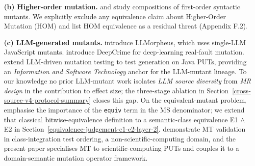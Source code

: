 \documentclass[manuscript,screen,review]{acmart}
\begin{document}
\textbf{(b) Higher-order mutation.} \citet{c03829bdd1a6e45113092384bf0fa05a064ca54a} and \citet{kintis2018effective}
study compositions of first-order syntactic mutants. We
explicitly exclude any equivalence claim about Higher-Order Mutation
(HOM) and list HOM equivalence as a residual threat (Appendix F.2).

\textbf{(c) LLM-generated mutants.} \citet{tip2025llmorpheus}
introduce LLMorpheus, which uses single-LLM JavaScript mutants.
\citet{humbatova2021deepcrime} introduce DeepCrime for
deep-learning real-fault mutation. \citet{dakhel2024llm} extend
LLM-driven mutation testing to test generation on Java PUTs, providing
an \emph{Information and Software Technology} anchor for the LLM-mutant
lineage. To our knowledge no prior LLM-mutant work isolates \emph{LLM
source diversity} from \emph{MR design} in the contribution to effect
size; the three-stage ablation in Section~\ref{cross-source-v4-protocol-summary} closes this gap. On the
equivalent-mutant problem, \citet{delgadoperez2020equivalent} emphasise
the importance of the \texttt{equiv} term in the MS denominator; we
extend that classical bitwise-equivalence definition to a semantic-class
equivalence E1 $\wedge$ E2 in Section~\ref{equivalence-judgement-e1-e2-layer-2}. \citet{zhang2021classintegration} demonstrate MT
validation in class-integration test ordering, a
non-scientific-computing domain, and the present paper specialises MT to
scientific-computing PUTs and couples it to a domain-semantic mutation
operator framework.
\end{document}
